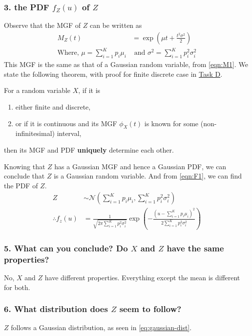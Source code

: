 \subsubsection*{3. \normalfont the PDF $f_Z(u)$ of $Z$}
Observe that the MGF of $Z$ can be written as
\begin{align*}
	M_Z(t)                                        & = \exp\left(\mu t + \frac{t^2\sigma^2}{2} \right)       \\
	\textrm{Where, } \mu = \sum_{i=1}^K p_i \mu_i & \textrm{ and } \sigma^2 = \sum_{i=1}^K p_i^2 \sigma_i^2
\end{align*}
This MGF is the same as that of a Gaussian random variable, from \cref{eqn:M1}.
We state the following theorem, with proof for finite discrete case in \hyperref[taskD]{Task D}.
\begin{theorem}\label{thm:MGF-PDF}
	For a random variable $X$, if it is
	\begin{enumerate}
		\item either finite and discrete,
		\item or if it is continuous and its MGF $\phi_X(t)$ is known for some (non-infinitesimal) interval,
	\end{enumerate}
	then its MGF and PDF \textbf{uniquely} determine each other.
\end{theorem}
Knowing that $Z$ has a Gaussian MGF and hence a Gaussian PDF, we can conclude that $Z$ is a Gaussian random variable.
And from \cref{eqn:F1}, we can find the PDF of $Z$.
\begin{align}
	Z                 & \sim \mathcal{N}\left(\sum_{i=1}^K p_i\mu_i, \sum_{i=1}^K p_i^2\sigma_i^2 \right)                                                                    \label{eq:gaussian-dist} \\
	\therefore f_z(u) & = \frac{1}{\sqrt{2\pi \sum_{i=1}^K p_i^2 \sigma_i^2}} \exp\left(-\frac{\left(u-\sum_{i=1}^K p_i\mu_i\right)^2}{2\sum_{i=1}^K p_i^2 \sigma_i^2}\right) \label{eq:P4}
\end{align}

\subsubsection*{5. \normalfont What can you conclude? Do $X$ and $Z$ have the same properties?}
No, $X$ and $Z$ have different properties. Everything except the mean is different for both.

\subsubsection*{6. \normalfont What distribution does $Z$ seem to follow?}
$Z$ follows a Gaussian distribution, as seen in \cref{eq:gaussian-dist}.

